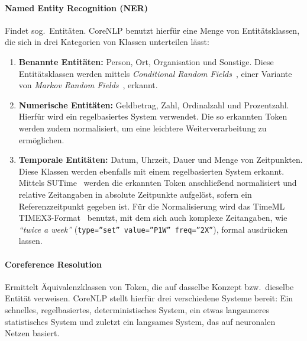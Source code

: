 \paragraph{Named Entity Recognition (NER)}
Findet sog.\ Entitäten.
CoreNLP benutzt hierfür eine Menge von Entitätsklassen, die sich in drei Kategorien von Klassen unterteilen lässt:
\begin{enumerate}
	\item \textbf{Benannte Entitäten:}
		Person, Ort, Organisation und Sonstige.
		Diese Entitätsklassen werden mittels \textit{Conditional Random Fields}~\cite{Finkel2005}, einer Variante von \textit{Markov Random Fields}~, erkannt.
	\item \textbf{Numerische Entitäten:}
		Geldbetrag, Zahl, Ordinalzahl und Prozentzahl.
		Hierfür wird ein regelbasiertes System verwendet.
		Die so erkannten Token werden zudem normalisiert, um eine leichtere Weiterverarbeitung zu ermöglichen.
	\item \textbf{Temporale Entitäten:}
		Datum, Uhrzeit, Dauer und Menge von Zeitpunkten.
		Diese Klassen werden ebenfalls mit einem regelbasierten System erkannt.
		Mittels SUTime~\cite{Chang2012} werden die erkannten Token anschließend normalisiert und relative Zeitangaben in absolute Zeitpunkte aufgelöst, sofern ein Referenzzeitpunkt gegeben ist.
		Für die Normalisierung wird das TimeML TIMEX3-Format~\cite{TIMEX3} benutzt, mit dem sich auch komplexe Zeitangaben, wie \textit{``twice a week''} (\texttt{type=''set'' value=''P1W'' freq=''2X''}), formal ausdrücken lassen.
\end{enumerate}

\paragraph{Coreference Resolution}
Ermittelt Äquivalenzklassen von Token, die auf dasselbe Konzept bzw.\ dieselbe Entität verweisen.
CoreNLP stellt hierfür drei verschiedene Systeme bereit:
Ein schnelles, regelbasiertes, deterministisches System, ein etwas langsameres statistisches System und zuletzt ein langsames System, das auf neuronalen Netzen basiert.

